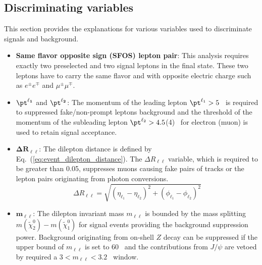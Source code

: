 \subsection{Discriminating variables}
\label{subsec:event_discriminating_variables}
This section provides the explanations for various variables used to discriminate signals and background.
%
\begin{itemize}
    \item \textbf{Same flavor opposite sign (SFOS) lepton pair}: This analysis requires exactly two preselected and two signal leptons in the final state.
    These two leptons have to carry the same flavor and with opposite electric charge such as $e^{\pm}e^{\mp}$ and $\mu^{\pm}\mu^{\mp}$.

    \item $\mathbf{\pt^{\ell_{1}}}$ and $\mathbf{\pt^{\ell_{2}}}$: The momentum of the leading lepton $\pt^{\ell_{1}} > 5$~{\GeV} is required to suppressed fake/non-prompt leptons background and the threshold of the momentum of the subleading lepton $\pt^{\ell_{2}} > 4.5$(4)~{\GeV} for electron (muon) is used to retain signal acceptance.

    \item $\mathbf{\Delta R_{\ell\ell}}$: The dilepton distance is defined by Eq.~(\ref{eq:event_dilepton_distance}).
    The $\Delta R_{\ell\ell}$ variable, which is required to be greater than 0.05, suppresses muons causing fake pairs of tracks or the lepton pairs originating from photon conversions.
    \begin{equation}
        \Delta R_{\ell \ell} = \sqrt{(\eta_{\ell_{1}} - \eta_{\ell_{2}})^{2} + (\phi_{\ell_{1}} - \phi_{\ell_{2}})^{2}}
        \label{eq:event_dilepton_distance}
    \end{equation}

    \item $\mathbf{m_{\ell\ell}}$: The dilepton invariant mass $m_{\ell\ell}$ is bounded by the mass splitting $m(\widetilde{\chi}^{0}_{2}) - m(\widetilde{\chi}^{0}_{1})$ for signal events providing the background suppression power.
    Background originating from on-shell $Z$ decay can be suppressed if the upper bound of $m_{\ell\ell}$ is set to 60~{\GeV} and the contributions from $J/\psi$ are vetoed by required a $3 < m_{\ell\ell} < 3.2$~{\GeV} window.


\end{itemize}
